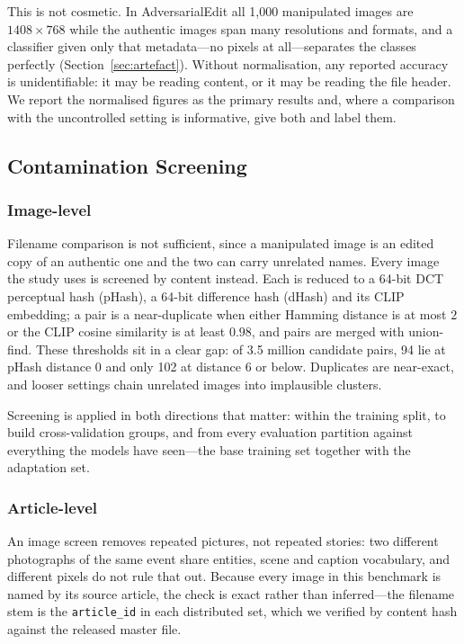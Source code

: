 This is not cosmetic. In AdversarialEdit all 1{,}000 manipulated images are
$1408 \times 768$ while the authentic images span many resolutions and formats,
and a classifier given only that metadata---no pixels at all---separates the
classes perfectly (Section~\ref{sec:artefact}). Without normalisation, any
reported accuracy is unidentifiable: it may be reading content, or it may be
reading the file header. We report the normalised figures as the primary
results and, where a comparison with the uncontrolled setting is informative,
give both and label them.

\subsection{Contamination Screening}
\label{sec:dedup}

\subsubsection{Image-level}
Filename comparison is not sufficient, since a manipulated image is an edited
copy of an authentic one and the two can carry unrelated names. Every image the
study uses is screened by content instead. Each is reduced to a 64-bit DCT
perceptual hash (pHash), a 64-bit difference hash (dHash) and its CLIP
embedding; a pair is a near-duplicate when either Hamming distance is at most
$2$ or the CLIP cosine similarity is at least $0.98$, and pairs are merged with
union-find. These thresholds sit in a clear gap: of 3.5 million candidate
pairs, 94 lie at pHash distance $0$ and only 102 at distance $6$ or below.
Duplicates are near-exact, and looser settings chain unrelated images into
implausible clusters.

Screening is applied in both directions that matter: within the training split,
to build cross-validation groups, and from every evaluation partition against
everything the models have seen---the base training set together with the
adaptation set.

\subsubsection{Article-level}
\label{sec:articles}
An image screen removes repeated pictures, not repeated stories: two different
photographs of the same event share entities, scene and caption vocabulary, and
different pixels do not rule that out. Because every image in this benchmark is
named by its source article, the check is exact rather than inferred---the
filename stem is the \texttt{article\_id} in each distributed set, which we
verified by content hash against the released master file.

